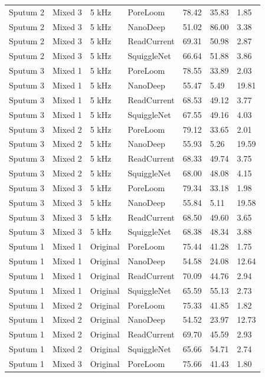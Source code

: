 \begin{longtable}{lllllll}
Sputum 2 & Mixed 3 & 5 kHz & PoreLoom & 78.42 & 35.83 & 1.85\\
Sputum 2 & Mixed 3 & 5 kHz & NanoDeep & 51.02 & 86.00 & 3.38\\
Sputum 2 & Mixed 3 & 5 kHz & ReadCurrent & 69.31 & 50.98 & 2.87\\
Sputum 2 & Mixed 3 & 5 kHz & SquiggleNet & 66.64 & 51.88 & 3.86\\
Sputum 3 & Mixed 1 & 5 kHz & PoreLoom & 78.55 & 33.89 & 2.03\\
Sputum 3 & Mixed 1 & 5 kHz & NanoDeep & 55.47 & 5.49 & 19.81\\
Sputum 3 & Mixed 1 & 5 kHz & ReadCurrent & 68.53 & 49.12 & 3.77\\
Sputum 3 & Mixed 1 & 5 kHz & SquiggleNet & 67.55 & 49.16 & 4.03\\
Sputum 3 & Mixed 2 & 5 kHz & PoreLoom & 79.12 & 33.65 & 2.01\\
Sputum 3 & Mixed 2 & 5 kHz & NanoDeep & 55.93 & 5.26 & 19.59\\
Sputum 3 & Mixed 2 & 5 kHz & ReadCurrent & 68.33 & 49.74 & 3.75\\
Sputum 3 & Mixed 2 & 5 kHz & SquiggleNet & 68.00 & 48.08 & 4.15\\
Sputum 3 & Mixed 3 & 5 kHz & PoreLoom & 79.34 & 33.18 & 1.98\\
Sputum 3 & Mixed 3 & 5 kHz & NanoDeep & 55.84 & 5.11 & 19.58\\
Sputum 3 & Mixed 3 & 5 kHz & ReadCurrent & 68.50 & 49.60 & 3.65\\
Sputum 3 & Mixed 3 & 5 kHz & SquiggleNet & 68.38 & 48.34 & 3.88\\
Sputum 1 & Mixed 1 & Original & PoreLoom & 75.44 & 41.28 & 1.75\\
Sputum 1 & Mixed 1 & Original & NanoDeep & 54.58 & 24.08 & 12.64\\
Sputum 1 & Mixed 1 & Original & ReadCurrent & 70.09 & 44.76 & 2.94\\
Sputum 1 & Mixed 1 & Original & SquiggleNet & 65.59 & 55.13 & 2.73\\
Sputum 1 & Mixed 2 & Original & PoreLoom & 75.33 & 41.85 & 1.82\\
Sputum 1 & Mixed 2 & Original & NanoDeep & 54.52 & 23.97 & 12.73\\
Sputum 1 & Mixed 2 & Original & ReadCurrent & 69.70 & 45.59 & 2.93\\
Sputum 1 & Mixed 2 & Original & SquiggleNet & 65.66 & 54.71 & 2.74\\
Sputum 1 & Mixed 3 & Original & PoreLoom & 75.66 & 41.43 & 1.80\\

\end{longtable}
